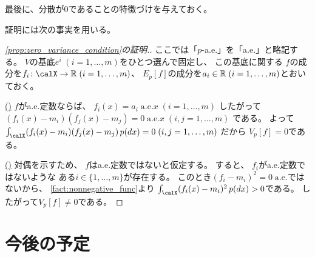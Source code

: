 \documentclass[report]{jlreq}
\begin{document}
最後に、分散が0であることの特徴づけを与えておく。


証明には次の事実を用いる。


\begin{proof}[\cref{prop:zero_variance_condition}の証明.]
    ここでは「$p$-a.e.」を「a.e.」と略記する。
    $V$の基底$e^i \; (i = 1, \dots, m)$をひとつ選んで固定し、
    この基底に関する
    $f$の成分を$f_i \colon \calX \to \R \; (i = 1, \dots, m)$、
    $E_p[f]$の成分を$a_i \in \mathbb{R} \; (i = 1, \dots, m)$とおいておく。

    \uline{(\Leftarrow)} \quad
    $f$がa.e.定数ならば、
    $f_i(x) = a_i \;
        \text{a.e.$x$} \;
        (i = 1, \dots, m)$
    したがって
    $(f_i(x) - m_i)(f_j(x) - m_j) = 0 \;
        \text{a.e.$x$} \;
        (i, j = 1, \dots, m)$
    である。
    よって
    $\int_\calX (f_i(x) - m_i)(f_j(x) - m_j) \, p(dx) = 0 \;
        (i, j = 1, \dots, m)$
    だから
    $V_p[f] = 0$である。

    \uline{(\Rightarrow)} \quad
    対偶を示すため、
    $f$はa.e.定数ではないと仮定する。
    すると、
    $f_i$がa.e.定数ではないような
    ある$i \in \{ 1, \dots, m \}$が存在する。
    このとき$(f_i - m_i)^2 = 0 \; \text{a.e.}$ではないから、
    \cref{fact:nonnegative_func}より
    $\int_\calX (f_i(x) - m_i)^2 \, p(dx) > 0$である。
    したがって$V_p[f] \neq 0$である。
\end{proof}

%
\section{今後の予定}
\end{document}
